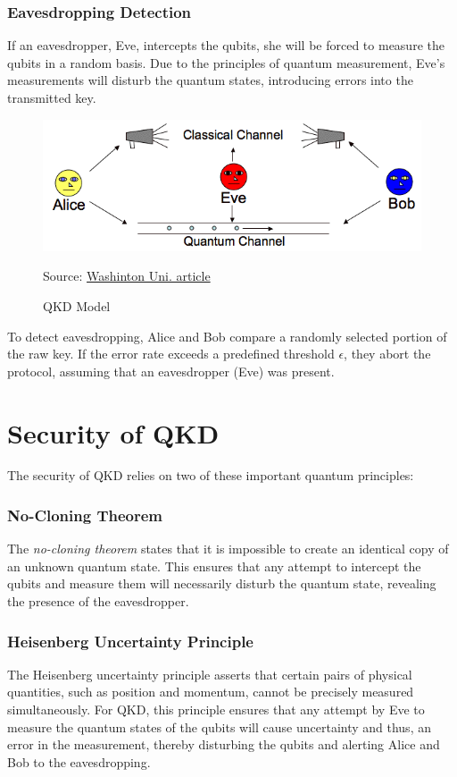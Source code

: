 \documentclass{article}
\newcommand{\source}[1]{\caption*{Source: {#1}} }
\begin{document}
\subsubsection*{Eavesdropping Detection}
If an eavesdropper, Eve, intercepts the qubits, she will be forced to measure the qubits in a random basis. Due to the principles of quantum measurement, Eve’s measurements will disturb the quantum states, introducing errors into the transmitted key. 
\begin{figure}[h]
    \centering
    \includegraphics[width = 7.00cm\textwidth]{fig1.png}
     \caption{QKD Model}
    \source{\href{https://www.cse.wustl.edu/~jain/cse571-07/ftp/quantum/}{Washinton Uni. article}}
   
\end{figure}

To detect eavesdropping, Alice and Bob compare a randomly selected portion of the raw key. If the error rate exceeds a predefined threshold \( \epsilon \), they abort the protocol, assuming that an eavesdropper (Eve) was present.


\section*{Security of QKD}

The security of QKD relies on two of these important quantum principles:

\subsubsection*{No-Cloning Theorem}

The \textit{no-cloning theorem} states that it is impossible to create an identical copy of an unknown quantum state. This ensures that any attempt to intercept the qubits and measure them will necessarily disturb the quantum state, revealing the presence of the eavesdropper.

\subsubsection*{Heisenberg Uncertainty Principle}

The Heisenberg uncertainty principle asserts that certain pairs of physical quantities, such as position and momentum, cannot be precisely measured simultaneously. For QKD, this principle ensures that any attempt by Eve to measure the quantum states of the qubits will cause uncertainty and thus, an error in the measurement, thereby disturbing the qubits and alerting Alice and Bob to the eavesdropping.
\end{document}
